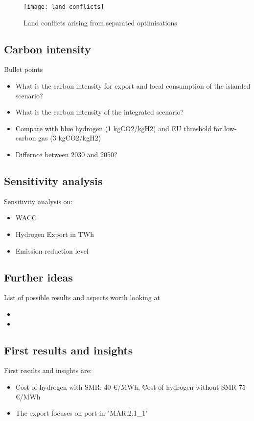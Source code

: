 \begin{figure}[h!]
    \centering
    \texttt{[image: land\_conflicts]}
    \caption{Land conflicts arising from separated optimisations}
    \label{fig:land_conflicts}
\end{figure}


\subsection{Carbon intensity}
Bullet points
\begin{itemize}
    \item What is the carbon intensity for export and local consumption of the islanded scenario? 
    \item What is the carbon intensity of the integrated scenario?
    \item Compare with blue hydrogen (1 kgCO2/kgH2) and EU threshold for low-carbon gas (3 kgCO2/kgH2)
    \item Differnce between 2030 and 2050?
\end{itemize}



\subsection{Sensitivity analysis}
Sensitivity analysis on:
\begin{itemize}
    \item WACC
    \item Hydrogen Export in TWh
    \item Emission reduction level
\end{itemize}


\subsection{Further ideas}
List of possible results and aspects worth looking at
\begin{itemize}
    \item 
    \item 
\end{itemize}


\subsection{First results and insights}

First results and insights are:
\begin{itemize}
    \item Cost of hydrogen with SMR: 40 €/MWh, Cost of hydrogen without SMR 75 €/MWh
    \item The export focuses on port in "MAR.2.1_1"
\end{itemize}



